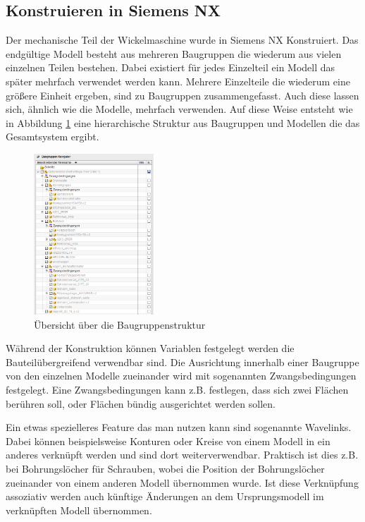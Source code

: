 \documentclass[paper=A4,pagesize,DIV=18, 12pt,listof=totoc,bibliography=totoc,headings=optiontohead,open=any]{article}
\begin{document}
\subsection{Konstruieren in Siemens NX}
Der mechanische Teil der Wickelmaschine wurde in Siemens NX Konstruiert. Das endgültige Modell besteht aus mehreren Baugruppen die wiederum aus vielen einzelnen Teilen bestehen. Dabei existiert für jedes Einzelteil ein Modell das später mehrfach verwendet werden kann.  Mehrere Einzelteile die wiederum eine größere Einheit ergeben, sind zu Baugruppen zusammengefasst. Auch diese lassen sich, ähnlich wie die Modelle, mehrfach verwenden. Auf diese Weise entsteht wie in Abbildung \ref{fig:baugruppenstruktur} eine hierarchische Struktur aus Baugruppen und Modellen die das Gesamtsystem ergibt. 
\begin{figure}[H]
	\centering
	\includegraphics[width=0.4\textwidth]{NX_Screenshots/baugruppen.png}
	\caption{Übersicht über die Baugruppenstruktur} 
	\label{fig:baugruppenstruktur}
\end{figure}


Während der Konstruktion können Variablen festgelegt werden die Bauteilübergreifend verwendbar sind. Die Ausrichtung innerhalb einer Baugruppe von den einzelnen Modelle zueinander wird mit sogenannten Zwangsbedingungen festgelegt. Eine Zwangsbedingungen kann z.B. festlegen, dass sich zwei Flächen berühren soll, oder Flächen bündig ausgerichtet werden sollen. 

Ein etwas spezielleres Feature das man nutzen kann sind sogenannte Wavelinks. Dabei können beispielsweise Konturen oder Kreise von einem Modell in ein anderes verknüpft werden und sind dort weiterverwendbar. Praktisch ist dies z.B. bei Bohrungslöcher für Schrauben, wobei die Position der Bohrungslöcher zueinander von einem anderen Modell übernommen wurde. Ist diese Verknüpfung assoziativ werden auch künftige Änderungen an dem Ursprungsmodell im verknüpften Modell übernommen.
    
\end{document}
